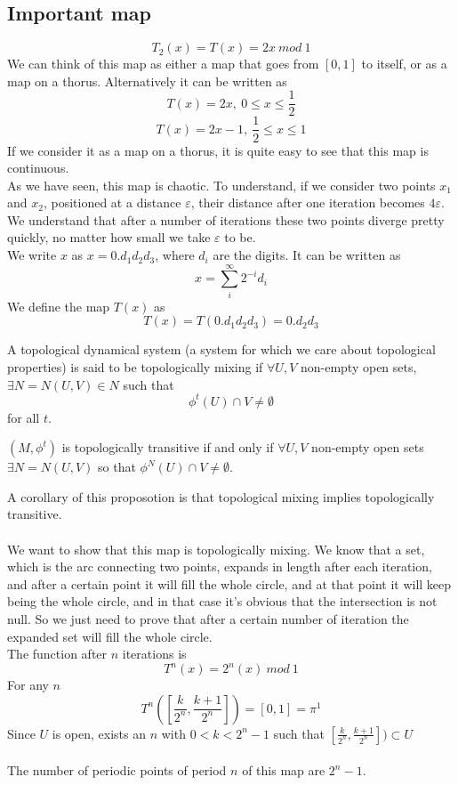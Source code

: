 \subsection{Important map}
$$
	T_2(x) = T(x) = 2x \ mod \ 1
$$
We can think of this map as either a map that goes from $[0,1]$ to itself, or as a map on a thorus. Alternatively it can be written as
$$
	T(x) = 2x, \ 0 \leq x \leq \frac{1}{2}
$$
$$
	T(x) = 2x-1, \ \frac{1}{2} \leq x \leq 1
$$
If we consider it as a map on a thorus, it is quite easy to see that this map is continuous. \\
As we have seen, this map is chaotic. To understand, if we consider two points $x_1$ and $x_2$, positioned at a distance $\varepsilon$, their distance after one iteration becomes $4\varepsilon$. \\

We understand that after a number of iterations these two points diverge pretty quickly, no matter how small we take $\varepsilon$ to be. \\
We write $x$ as $x = 0.d_1d_2d_3$, where $d_i$ are the digits. It can be written as
$$
	x = \sum_i^{\infty} 2^{-i}d_i
$$
We define the map $T(x)$ as 
$$
	T(x) = T(0.d_1d_2d_3) = 0.d_2d_3
$$
\begin{definition}
	A topological dynamical system (a system for which we care about topological properties) is said to be topologically mixing if $\forall U,V$ non-empty open sets, $\exists N = N(U,V) \in N$ such that 
	$$
		\phi^t(U) \cap V \neq \emptyset
	$$
	for all $t$.
\end{definition}
\begin{prop}
	$(M,\phi^t)$ is topologically transitive if and only if $\forall U,V$ non-empty open sets $\exists N = N(U,V)$ so that $\phi^N(U)\cap V \neq \emptyset$.
\end{prop}
A corollary of this proposotion is that topological mixing implies topologically transitive. \\ \\
We want to show that this map is topologically mixing. We know that a set, which is the arc connecting two points, expands in length after each iteration, and after a certain point it will fill the whole circle, and at that point it will keep being the whole circle, and in that case it's obvious that the intersection is not null. So we just need to prove that after a certain number of iteration the expanded set will fill the whole circle. \\
The function after $n$ iterations is
$$
	T^n(x) = 2^n(x) \ mod \ 1
$$
For any $n$
$$
	T^n(\left[\frac{k}{2^n},\frac{k+1}{2^n}\right]) = [0,1] = \pi^1
$$
Since $U$ is open, exists an $n$ with $0 < k < 2^n - 1$ such that $\left[\frac{k}{2^n},\frac{k+1}{2^n}\right]) \subset U$ \\ \\
The number of periodic points of period $n$ of this map are $2^n - 1$. 

